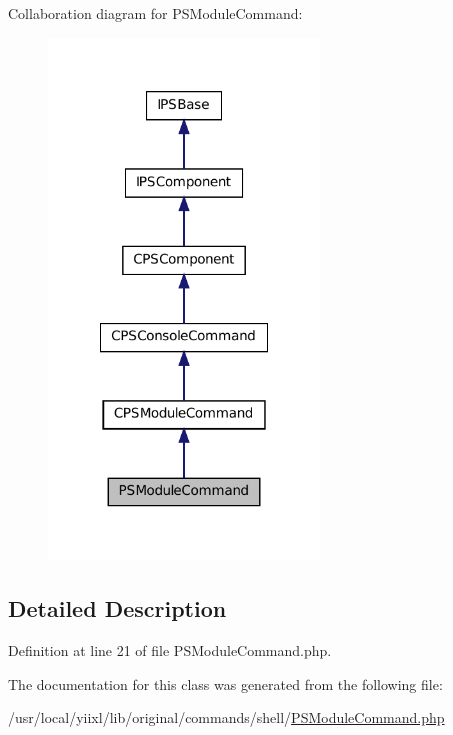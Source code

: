 Collaboration diagram for PSModuleCommand:\nopagebreak
\begin{figure}[H]
\begin{center}
\leavevmode
\includegraphics[width=204pt]{classPSModuleCommand__coll__graph}
\end{center}
\end{figure}


\subsection{Detailed Description}


Definition at line 21 of file PSModuleCommand.php.



The documentation for this class was generated from the following file:\begin{DoxyCompactItemize}
\item 
/usr/local/yiixl/lib/original/commands/shell/\hyperlink{PSModuleCommand_8php}{PSModuleCommand.php}\end{DoxyCompactItemize}
